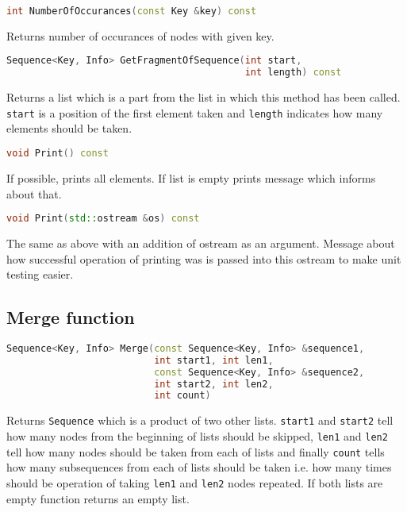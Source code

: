 \documentclass{article}
\begin{document}
\begin{lstlisting}[language=C++]
int NumberOfOccurances(const Key &key) const
\end{lstlisting}
Returns number of occurances of nodes with given key.

\begin{lstlisting}[language=C++]
Sequence<Key, Info> GetFragmentOfSequence(int start,
                                          int length) const
\end{lstlisting}
Returns a list which is a part from the list in which this method has been called.
{\tt start} is a position of the first element taken and {\tt length} indicates
how many elements should be taken.

\begin{lstlisting}[language=C++]
void Print() const
\end{lstlisting}
If possible, prints all elements. If list is empty prints message which informs about that.

\begin{lstlisting}[language=C++]
void Print(std::ostream &os) const
\end{lstlisting}
The same as above with an addition of ostream as an argument. Message about how successful
operation of printing was is passed into this ostream to make unit testing easier.

\vspace{\baselineskip}

\subsection{Merge function}

\begin{lstlisting}[language=C++]
Sequence<Key, Info> Merge(const Sequence<Key, Info> &sequence1,
                          int start1, int len1,
                          const Sequence<Key, Info> &sequence2,
                          int start2, int len2,
                          int count)
\end{lstlisting}
Returns {\tt Sequence} which is a product of two other lists. {\tt start1} and
{\tt start2} tell how many nodes from the beginning of lists should be skipped,
{\tt len1} and {\tt len2} tell how many nodes should be taken from each of lists
and finally {\tt count} tells how many subsequences from each of lists should be
taken i.e. how many times should be operation of taking {\tt len1} and {\tt len2}
nodes repeated. If both lists are empty function returns an empty list.
\vspace{\baselineskip}
\end{document}
